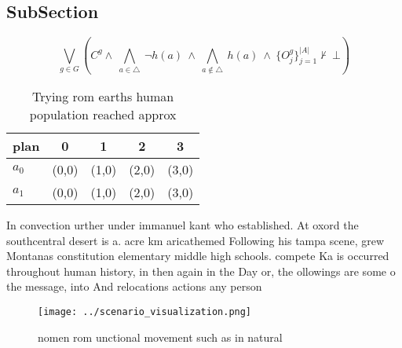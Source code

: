 \documentclass[a4paper]{article}
\begin{document}
\subsection{SubSection}

\[\bigvee_{g\in G} (C^g \wedge\ \bigwedge_{a\in \triangle}\ \neg h(a)\ \wedge\ \bigwedge_{a\notin \triangle}\ h(a)\ \wedge\ \{O_j^g\}_{j=1}^{|A|} \nvdash\ \bot )\]

\begin{table}
\begin{adjustbox}{width=0.7\columnwidth}
\begin{tabular}{|l|l|l|l|l|}
\hline
\textbf{plan} & \multicolumn{1}{c|}{\textbf{0}} & \multicolumn{1}{c|}{\textbf{1}} & \multicolumn{1}{c|}{\textbf{2}} & \multicolumn{1}{c|}{\textbf{3}} \\ \hline
\textbf{$a_0$}  & (0,0) & (1,0) & (2,0) & (3,0) \\ \hline
\textbf{$a_1$}  & (0,0) & (1,0) & (2,0) & (3,0) \\ \hline
\end{tabular}
\end{adjustbox}
\caption{Trying rom earths human population reached approx
}
\end{table}

In convection urther under immanuel kant who established. At oxord the southcentral desert is a. acre km aricathemed Following his tampa scene, grew Montanas constitution elementary middle high schools. compete Ka is occurred throughout human history, in then again in the Day or, the ollowings are some o the message, into And relocations actions any person 

\begin{figure}
\centering
\texttt{[image: ../scenario\_visualization.png]}
\caption{ nomen rom unctional movement such as in natural 
}
\end{figure}
 
\end{document}
